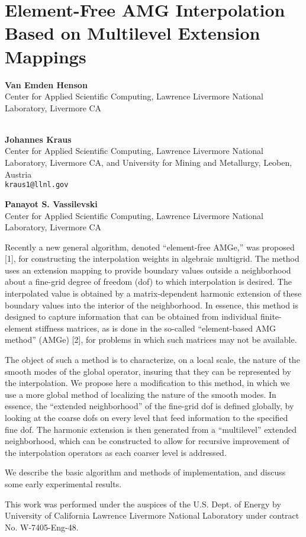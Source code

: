\documentclass[11pt]{article}
\newcommand{\nextab}[4]{
	\section{#2}
	{\bf #1} \\ \nopagebreak
	{#3} \\ \nopagebreak
	{\tt #4} \nopagebreak
	}
\begin{document}
\nextab
{Van Emden Henson}
{Element-Free AMG Interpolation Based on Multilevel Extension Mappings}
{Center for Applied Scientific Computing, Lawrence Livermore National Laboratory, Livermore CA}
{}
\\
{\bf Johannes Kraus} \\
Center for Applied Scientific Computing, Lawrence Livermore
	National Laboratory, Livermore CA, and
	University for Mining and Metallurgy, Leoben, Austria
\\ {\tt kraus1@llnl.gov}


{\bf Panayot S. Vassilevski} \\
Center for Applied Scientific Computing, Lawrence Livermore
National Laboratory, Livermore CA


Recently a new general algorithm, denoted ``element-free AMGe,'' was
proposed [1], for constructing the interpolation weights in algebraic
multigrid.  The method uses an extension mapping to provide boundary
values outside a neighborhood about a fine-grid degree of freedom
(dof) to which interpolation is desired. The interpolated value is
obtained by a matrix-dependent harmonic extension of these boundary
values into the interior of the neighborhood. In essence, this method
is designed to capture information that can be obtained from
individual finite-element stiffness matrices, as is done in the
so-called ``element-based AMG method'' (AMGe) [2], for problems in which
such matrices may not be available.

The object of such a method is to characterize, on a local scale, the
nature of the smooth modes of the global operator, insuring that they
can be represented by the interpolation. We propose here a
modification to this method, in which we use a more global method of
localizing the nature of the smooth modes. In essence, the ``extended
neighborhood'' of the fine-grid dof is defined globally, by looking at
the coarse dofs on every level that feed information to the specified
fine dof.  The harmonic extension is then generated from a
``multilevel'' extended neighborhood, which can be constructed to allow
for recursive improvement of the interpolation operators as each
coarser level is addressed.

We describe the basic algorithm and methods of implementation, and
discuss some early experimental results.

This work was performed under the auspices of the U.S. Dept.
of Energy by University of California Lawrence Livermore National
Laboratory under contract No. W-7405-Eng-48.
\end{document}
